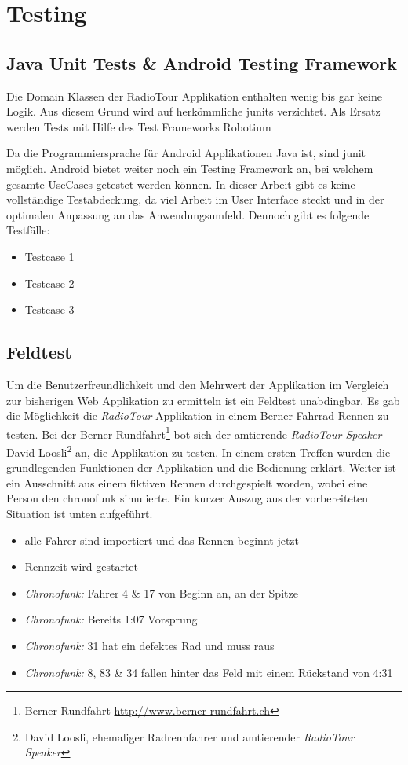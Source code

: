 \chapter{Testing}

\section{Java Unit Tests \& Android Testing Framework}
Die Domain Klassen der RadioTour Applikation enthalten wenig bis gar keine Logik. Aus diesem Grund wird auf herkömmliche \glspl{junit} verzichtet. Als Ersatz werden Tests mit Hilfe des Test Frameworks Robotium 


Da die Programmiersprache für Android Applikationen Java ist, sind \gls{junit} möglich. Android bietet weiter noch ein Testing Framework an, bei welchem gesamte UseCases getestet werden können. In dieser Arbeit gibt es keine vollständige Testabdeckung, da viel Arbeit im User Interface steckt und in der optimalen Anpassung an das Anwendungsumfeld. Dennoch gibt es folgende Testfälle:

\begin{itemize}
\item Testcase 1
\item Testcase 2
\item Testcase 3
\end{itemize}

\section{Feldtest}
Um die Benutzerfreundlichkeit und den Mehrwert der Applikation im Vergleich zur bisherigen Web Applikation zu ermitteln ist ein Feldtest unabdingbar. Es gab die Möglichkeit die \textit{RadioTour} Applikation in einem Berner Fahrrad Rennen zu testen. Bei der Berner Rundfahrt\footnote{Berner Rundfahrt \url{http://www.berner-rundfahrt.ch}} bot sich der amtierende \textit{RadioTour Speaker} David Loosli\footnote{David Loosli, ehemaliger Radrennfahrer und amtierender \textit{RadioTour Speaker}} an, die Applikation zu testen. In einem ersten Treffen wurden die grundlegenden Funktionen der Applikation und die Bedienung erklärt. Weiter ist ein Ausschnitt aus einem fiktiven Rennen durchgespielt worden, wobei eine Person den \gls{chronofunk} simulierte. Ein kurzer Auszug aus der vorbereiteten Situation ist unten aufgeführt.

\begin{itemize}
\item alle Fahrer sind importiert und das Rennen beginnt jetzt
\item Rennzeit wird gestartet
\item \textit{Chronofunk:} Fahrer 4 \& 17 von Beginn an, an der Spitze
\item \textit{Chronofunk:} Bereits 1:07 Vorsprung
\item \textit{Chronofunk:} 31 hat ein defektes Rad und muss raus
\item \textit{Chronofunk:} 8, 83 \& 34 fallen hinter das Feld mit einem Rückstand von 4:31
\end{itemize}

